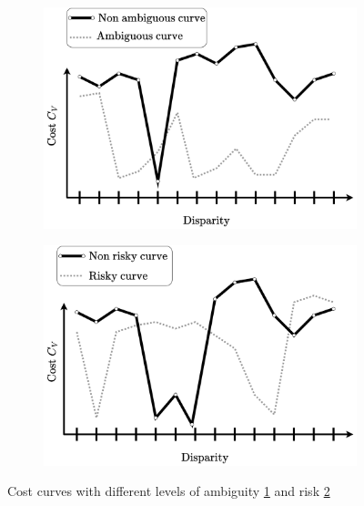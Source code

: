 \begin{figure}
    \centering
    \begin{subfigure}[t]{0.5\linewidth}
        \centering
        \includegraphics[width=\linewidth]{Images/Chap_1/Ambiguity.png}
        \caption{}
        \label{fig:ambgiuity}
    \end{subfigure}\hfill
    \begin{subfigure}[t]{0.5\linewidth}
        \centering
        \includegraphics[width=\linewidth]{Images/Chap_1/Risk.png}
        \caption{}
        \label{fig:risk}
    \end{subfigure}\hfill
    \caption{Cost curves with different levels of ambiguity \ref{fig:ambgiuity} and risk \ref{fig:risk}}
    \label{fig:ambiguity_risk}
\end{figure}

